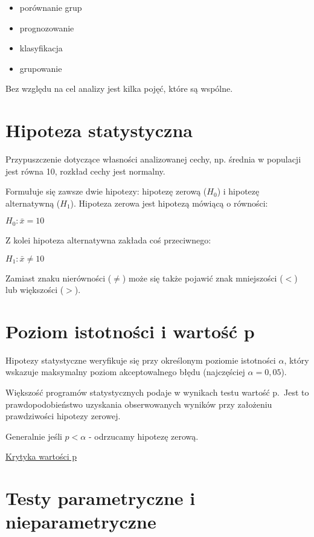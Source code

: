 \documentclass[]{book}
\providecommand{\tightlist}{%
  \setlength{\itemsep}{0pt}\setlength{\parskip}{0pt}}
\begin{document}
\begin{itemize}
\tightlist
\item
  porównanie grup
\item
  prognozowanie
\item
  klasyfikacja
\item
  grupowanie
\end{itemize}

Bez względu na cel analizy jest kilka pojęć, które są wspólne.

\section{Hipoteza statystyczna}\label{hipoteza-statystyczna}

Przypuszczenie dotyczące własności analizowanej cechy, np. średnia w
populacji jest równa 10, rozkład cechy jest normalny.

Formułuje się zawsze dwie hipotezy: hipotezę zerową (\(H_0\)) i hipotezę
alternatywną (\(H_1\)). Hipoteza zerowa jest hipotezą mówiącą o
równości:

\(H_0: \bar{x}=10\)

Z kolei hipoteza alternatywna zakłada coś przeciwnego:

\(H_1: \bar{x}\neq 10\)

Zamiast znaku nierówności (\(\neq\)) może się także pojawić znak
mniejszości (\(<\)) lub większości (\(>\)).

\section{Poziom istotności i wartość
p}\label{poziom-istotnosci-i-wartosc-p}

Hipotezy statystyczne weryfikuje się przy określonym poziomie istotności
\(\alpha\), który wskazuje maksymalny poziom akceptowalnego błędu
(najczęściej \(\alpha=0,05\)).

Większość programów statystycznych podaje w wynikach testu wartość
p.~Jest to prawdopodobieństwo uzyskania obserwowanych wyników przy
założeniu prawdziwości hipotezy zerowej.

Generalnie jeśli \(p < \alpha\) - odrzucamy hipotezę zerową.

\href{http://idane.pl/blog/asa}{Krytyka wartości p}

\section{Testy parametryczne i
nieparametryczne}\label{testy-parametryczne-i-nieparametryczne}
\end{document}
